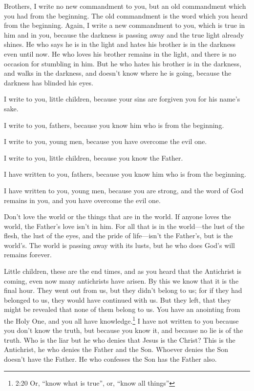 Brothers, I write no new commandment to you, but an old
commandment which you had from the beginning. The old commandment is the
word which you heard from the beginning.  Again, I write a
new commandment to you, which is true in him and in you, because the
darkness is passing away and the true light already shines. 
He who says he is in the light and hates his brother is in the darkness
even until now.  He who loves his brother remains in the
light, and there is no occasion for stumbling in him.  But
he who hates his brother is in the darkness, and walks in the darkness,
and doesn't know where he is going, because the darkness has blinded his
eyes.

 I write to you, little children, because your sins are
forgiven you for his name's sake.

 I write to you, fathers, because you know him who is from
the beginning.

I write to you, young men, because you have overcome the evil one.

I write to you, little children, because you know the Father.

 I have written to you, fathers, because you know him who
is from the beginning.

I have written to you, young men, because you are strong, and the word
of God remains in you, and you have overcome the evil one.

 Don't love the world or the things that are in the world.
If anyone loves the world, the Father's love isn't in him. 
For all that is in the world---the lust of the flesh, the lust of the
eyes, and the pride of life---isn't the Father's, but is the world's.
 The world is passing away with its lusts, but he who does
God's will remains forever.

 Little children, these are the end times, and as you heard
that the Antichrist is coming, even now many antichrists have arisen. By
this we know that it is the final hour.  They went out from
us, but they didn't belong to us; for if they had belonged to us, they
would have continued with us. But they left, that they might be revealed
that none of them belong to us.  You have an anointing from
the Holy One, and you all have knowledge.\footnote{2:20 Or, ``know what
  is true'', or, ``know all things''}  I have not written
to you because you don't know the truth, but because you know it, and
because no lie is of the truth.  Who is the liar but he who
denies that Jesus is the Christ? This is the Antichrist, he who denies
the Father and the Son.  Whoever denies the Son doesn't
have the Father. He who confesses the Son has the Father also.

